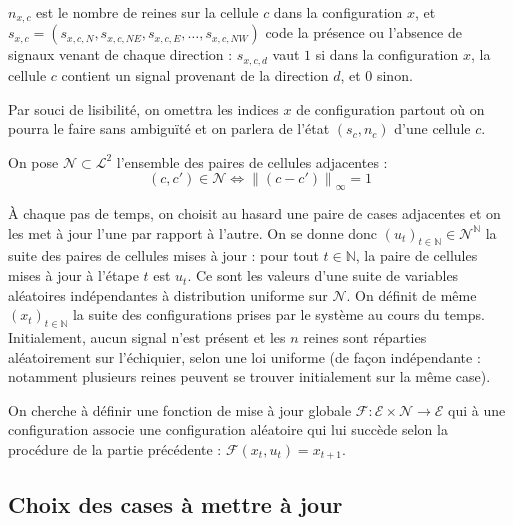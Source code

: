 \documentclass[11pt, openany]{article}
\newcommand{\N}{\mathbb{N}}
\newcommand{\norm}[1]{\left\lVert#1\right\rVert}
\newcommand{\La}{\mathcal{L}}
\newcommand{\Ne}{\mathcal{N}}
\newcommand{\E}{\mathcal{E}}
\begin{document}
\noindent
$n_{x,c}$ est le nombre de reines sur la cellule $c$ dans la configuration $x$, et $s_{x,c} = (s_{x,c,N}, s_{x,c,NE}, s_{x,c,E}, \ldots, s_{x,c,NW})$ code la présence ou l'absence de signaux venant de chaque direction : $s_{x,c,d}$ vaut $1$ si dans la configuration $x$, la cellule $c$ contient un signal provenant de la direction $d$, et $0$ sinon.


Par souci de lisibilité, on omettra les indices $x$ de configuration partout où on pourra le faire sans ambiguïté et on parlera de l'état $(s_c, n_c)$ d'une cellule $c$.

On pose $\Ne \subset \La^2$ l'ensemble des paires de cellules adjacentes : $$(c, c') \in \Ne \iff \norm{(c-c')}_\infty = 1$$

À chaque pas de temps, on choisit au hasard une paire de cases adjacentes et on les met à jour l'une par rapport à l'autre.
On se donne donc $(u_t)_{t\in\N} \in \Ne^\N$ la suite des paires de cellules mises à jour : pour tout $t\in\N$, la paire de cellules mises à jour à l'étape $t$ est $u_t$. Ce sont les valeurs d'une suite de variables aléatoires indépendantes à distribution uniforme sur $\Ne$. On définit de même $(x_t)_{t\in\N}$ la suite des configurations prises par le système au cours du temps. Initialement, aucun signal n'est présent et les $n$ reines sont réparties aléatoirement sur l'échiquier, selon une loi uniforme (de façon indépendante : notamment plusieurs reines peuvent se trouver initialement sur la même case). 

On cherche à définir une fonction de mise à jour globale $\mathcal{F} : {\E\times\Ne}\to\E$ qui à une configuration associe une configuration aléatoire qui lui succède selon la procédure de la partie précédente : $\mathcal{F}(x_t, u_t) = x_{t+1}$.

 
\subsection*{Choix des cases à mettre à jour}
\end{document}
